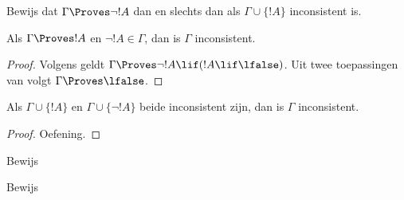 \documentclass[../../../include/open-logic-section]{subfiles}
\begin{document}
\begin{prob}
Bewijs dat $\Gamma \Proves \lnot !A$ dan en slechts dan als $\Gamma
\cup \{!A\}$ inconsistent is.
\end{prob}

\begin{prop}
  Als $\Gamma \Proves !A$ en $\lnot !A \in \Gamma$, dan is $\Gamma$
  inconsistent.
\end{prop}

\begin{proof}
  Volgens  geldt $\Gamma \Proves \lnot !A \lif
  (!A \lif \lfalse)$. Uit twee toepassingen van
   volgt $\Gamma \Proves \lfalse$.
\end{proof}


\begin{prop}
  Als $\Gamma \cup \{!A\}$ en $\Gamma \cup \{\lnot !A\}$ beide
  inconsistent zijn, dan is $\Gamma$ inconsistent.
\end{prop}

\begin{proof}
Oefening.
\end{proof}

\begin{prob}
  Bewijs 
\end{prob}
\tagendprob

\begin{prob}
  Bewijs 
\end{prob}
\tagendprob
\end{document}
